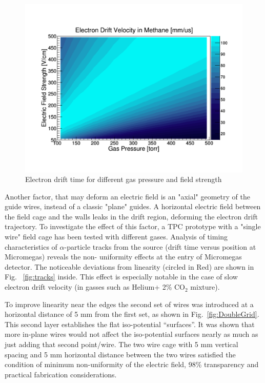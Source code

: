 \documentclass[final,number,sort&compress,5p,times,twocolumn]{elsarticle}
\begin{document}
\begin{figure}[hbt!]
    \centering
   \includegraphics[width=1.0\columnwidth]{Figs/FieldVsP}	
    \caption{Electron drift time for different gas pressure and field strength}
     \label{fig:FieldVsP} 
\end{figure}
		
Another factor, that may deform an electric field  is an "axial" geometry of the guide wires, instead of a classic "plane" guides. A  horizontal electric field between the field cage and the walls leaks in the drift region, deforming the electron drift trajectory. To investigate the effect of this factor, a TPC prototype with a  "single wire" field cage has been tested with different gases. Analysis of timing characteristics of $\alpha$-particle tracks from the source (drift time versus position at Micromegas) reveals the non- uniformity effects at the entry of Micromegas detector.  The noticeable deviations from linearity (circled in Red) are shown in Fig. ~\ref{fig:tracks} inside. This effect is especially notable in the case of slow electron drift velocity (in gasses such as Helium+ 2\% CO$_2$ mixture). 

To improve linearity near the edges the second set of wires was introduced at a horizontal distance of 5 mm from the first set, as shown in Fig.~\ref{fig:DoubleGrid}. This second layer establishes the flat iso-potential ``surfaces''. It was shown that more in-plane wires would not affect the iso-potential surfaces nearly as much as just adding that second point/wire.
The two wire cage with 5 mm vertical spacing and 5 mm horizontal distance between the two wires satisfied the condition of minimum non-uniformity of the electric field, 98\% transparency and practical fabrication considerations.
\end{document}
